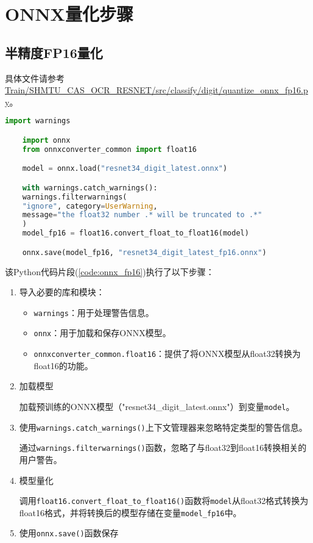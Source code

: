 \section{ONNX量化步骤}

\subsection{半精度FP16量化}

具体文件请参考\url{Train/SHMTU_CAS_OCR_RESNET/src/classify/digit/quantize_onnx_fp16.py}。

\begin{lstlisting}[caption={ONNX FP16量化},language=Python,label=code:onnx_fp16]
	import warnings

	import onnx
	from onnxconverter_common import float16

	model = onnx.load("resnet34_digit_latest.onnx")

	with warnings.catch_warnings():
	warnings.filterwarnings(
	"ignore", category=UserWarning,
	message="the float32 number .* will be truncated to .*"
	)
	model_fp16 = float16.convert_float_to_float16(model)

	onnx.save(model_fp16, "resnet34_digit_latest_fp16.onnx")

\end{lstlisting}

该Python代码片段(\ref{code:onnx_fp16})执行了以下步骤：

\begin{enumerate}
	\item {
		导入必要的库和模块：

		\begin{itemize}
			\item \texttt{warnings}：用于处理警告信息。
			\item \texttt{onnx}：用于加载和保存ONNX模型。
			\item \texttt{onnxconverter\_common.float16}：提供了将ONNX模型从float32转换为float16的功能。
		\end{itemize}
	}

	\item {加载模型

		加载预训练的ONNX模型（"resnet34\_digit\_latest.onnx"）到变量\texttt{model}。
	}

	\item {
		使用\texttt{warnings.catch\_warnings()}上下文管理器来忽略特定类型的警告信息。

		通过\texttt{warnings.filterwarnings()}函数，忽略了与float32到float16转换相关的用户警告。
	}

	\item {
		模型量化

		调用\texttt{float16.convert\_float\_to\_float16()}函数将\texttt{model}从float32格式转换为float16格式，并将转换后的模型存储在变量\texttt{model\_fp16}中。
	}

	\item {
		使用\texttt{onnx.save()}函数保存
	}

\end{enumerate}

